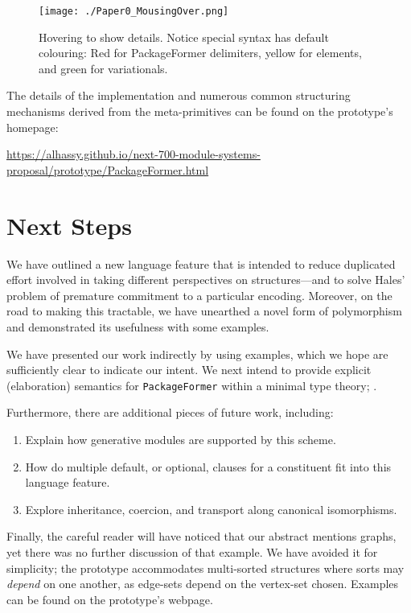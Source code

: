 \documentclass[sigplan,screen]{acmart}
\begin{document}
\begin{figure}[htbp]
\centering
\texttt{[image: ./Paper0\_MousingOver.png]}
\caption{Hovering to show details. Notice special syntax has default colouring: Red for PackageFormer delimiters, yellow for elements, and green for variationals.}
\end{figure}

\noindent
The details of the implementation and numerous common structuring mechanisms
derived from the meta-primitives can be found on the prototype's homepage:
\begin{center}
\url{https://alhassy.github.io/next-700-module-systems-proposal/prototype/PackageFormer.html}
\end{center}

\section{Next Steps}
\label{sec:orgcf66414}
We have outlined a new language feature that is intended to reduce
duplicated effort involved in taking different perspectives on structures---and to solve
Hales' problem of premature commitment to a particular encoding. Moreover, on the road
to making this tractable, we have unearthed a novel form of polymorphism and demonstrated
its usefulness with some examples.

We have presented our work indirectly by using examples, which we
hope are sufficiently clear to indicate our intent. We next intend to
provide explicit (elaboration) semantics for \texttt{PackageFormer} within a
minimal type theory; \newline \cite{types_for_modules}.

Furthermore, there are additional pieces of future work, including:

\begin{enumerate}
\item Explain how generative modules \cite{modular_modules}
are supported by this scheme.

\item How do multiple default, or optional, clauses for a constituent fit into this
language feature.

\item Explore inheritance, coercion, and transport along canonical isomorphisms.
\end{enumerate}

\noindent
Finally, the careful reader will have noticed
that our abstract mentions graphs, yet
there was no further discussion of that example.
We have avoided it for simplicity;
the prototype accommodates multi-sorted structures where
sorts may \emph{depend} on one another, as edge-sets
depend on the vertex-set chosen. Examples can be found on the prototype's
webpage.
\end{document}
